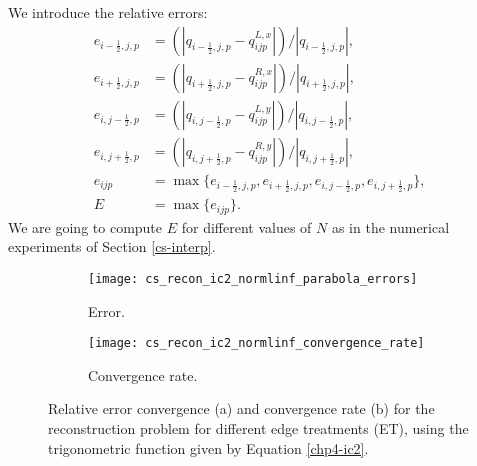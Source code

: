 We introduce the relative errors:
\begin{align*}
	e_{{i-\frac{1}{2}},j,p} &= (|q_{{i-\frac{1}{2}},j,p} - q^{L,x}_{ijp}|)/|q_{{i-\frac{1}{2}},j,p}|,\\
	e_{{i+\frac{1}{2}},j,p} &= (|q_{{i+\frac{1}{2}},j,p} - q^{R,x}_{ijp}|)/|q_{{i+\frac{1}{2}},j,p}|,\\
	e_{i,{j-\frac{1}{2}},p} &= (|q_{i,{j-\frac{1}{2}},p} - q^{L,y}_{ijp}|)/|q_{i,{j-\frac{1}{2}},p}|,\\
	e_{i,{j+\frac{1}{2}},p} &= (|q_{i,{j+\frac{1}{2}},p} - q^{R,y}_{ijp}|)/|q_{i,{j+\frac{1}{2}},p}|,\\
	e_{ijp} &= \max\{e_{{i-\frac{1}{2}},j,p}, e_{{i+\frac{1}{2}},j,p} , e_{i,{j-\frac{1}{2}},p}, e_{i,{j+\frac{1}{2}},p} \},\\
	E &= \max \{e_{ijp}\}.
\end{align*}
We are going to compute $E$ for different values of $N$ as in the numerical experiments of Section \ref{cs-interp}.
\begin{figure}[!htb]
	\centering
	\begin{subfigure}{0.45\textwidth}
		\centering
		\texttt{[image: cs\_recon\_ic2\_normlinf\_parabola\_errors]}
		\caption{Error.\label{chp4-exp3-error}}
	\end{subfigure}
	\begin{subfigure}{0.45\textwidth}
		\centering
		\texttt{[image: cs\_recon\_ic2\_normlinf\_convergence\_rate]}
		\caption{Convergence rate.\label{chp4-exp3-CR}}
	\end{subfigure}
	\caption{Relative error convergence (a) and convergence rate (b) for the reconstruction problem for different
	edge treatments (ET), using the trigonometric function given by Equation \eqref{chp4-ic2}.\label{chp4-exp3}}
\end{figure}

